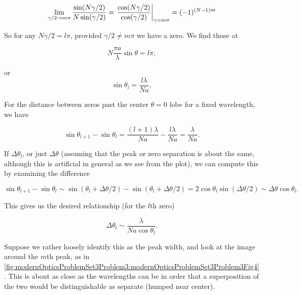 {\begin{dmath}\label{eqn:modernOptics:problemSet3:3:360}
\lim_{\gamma/2 \rightarrow m \pi}
\frac{\sin( N \gamma / 2 )}
{N \sin( \gamma/2) }
=
\evalbar{\frac{\cos( N \gamma / 2 )}
{\cos( \gamma/2) }}{\gamma = m \pi}
= (-1)^{(N -1) m}
\end{dmath}

So for any $N \gamma/2 = l \pi$, provided $\gamma/2 \ne m \pi$ we have a zero.  We find those at

\begin{dmath}\label{eqn:modernOptics:problemSet3:3:380}
N \frac{\pi a}{\lambda} \sin\theta = l \pi,
\end{dmath}

or
\begin{dmath}\label{eqn:modernOptics:problemSet3:3:400}
\sin\theta_l = \frac{l \lambda}{N a},
\end{dmath}

For the distance between zeros past the center $\theta = 0$ lobe for a fixed wavelength, we have

\begin{dmath}\label{eqn:modernOptics:problemSet3:3:420}
\sin\theta_{l+1} - \sin\theta_l =
\frac{(l+1) \lambda}{N a}
-
\frac{l \lambda}{N a}
=
\frac{\lambda}{N a}.
\end{dmath}

If $\Delta \theta_l$, or just $\Delta \theta$ (assuming that the peak or zero separation is about the same, although this is artificial in general as we see from the plot), we can compute this by examining the difference

\begin{dmath}\label{eqn:modernOptics:problemSet3:3:440}
\sin\theta_{l+1} - \sin\theta_l
\sim
\sin(\theta_l + \Delta \theta/2)
-\sin(\theta_l + \Delta \theta/2)
= 2 \cos \theta_l \sin (\Delta \theta/2)
\sim \Delta \theta \cos\theta_l.
\end{dmath}

This gives us the desired relationship (for the $l$th zero)

\begin{dmath}\label{eqn:modernOptics:problemSet3:3:460}
\boxed{
\Delta \theta_l \sim \frac{\lambda}{N a \cos\theta_l}.
}
\end{dmath}

Suppose we rather loosely identify this as the peak width, and look at the image around the $m$th peak, as in \cref{fig:modernOpticsProblemSet3Problem3:modernOpticsProblemSet3Problem3Fig4}.  This is about as close as the wavelengths can be in order that a superposition of the two would be distinguishable as separate (humped near center).

}
